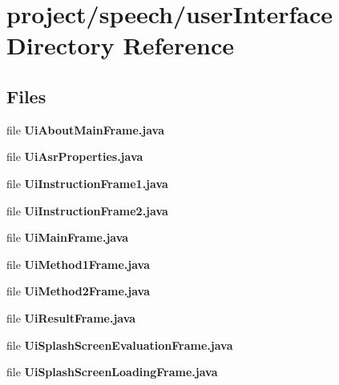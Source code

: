 \section{project/speech/user\+Interface Directory Reference}
\label{dir_0283843da58f612939ec43bb707c15e6}
\subsection*{Files}
\begin{DoxyCompactItemize}
\item 
file {\bfseries Ui\+About\+Main\+Frame.\+java}
\item 
file {\bfseries Ui\+Asr\+Properties.\+java}
\item 
file {\bfseries Ui\+Instruction\+Frame1.\+java}
\item 
file {\bfseries Ui\+Instruction\+Frame2.\+java}
\item 
file {\bfseries Ui\+Main\+Frame.\+java}
\item 
file {\bfseries Ui\+Method1\+Frame.\+java}
\item 
file {\bfseries Ui\+Method2\+Frame.\+java}
\item 
file {\bfseries Ui\+Result\+Frame.\+java}
\item 
file {\bfseries Ui\+Splash\+Screen\+Evaluation\+Frame.\+java}
\item 
file {\bfseries Ui\+Splash\+Screen\+Loading\+Frame.\+java}
\end{DoxyCompactItemize}
